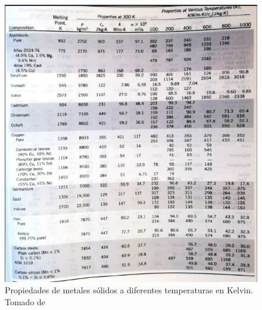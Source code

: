 \documentclass[12pt,letterpaper]{article}     %
\begin{document}
\begin{figure}[H]
\centering
\includegraphics[width=1.2\textwidth]{Imagines/propiedadesmet1.png}
\caption{Propiedades de metales sólidos a diferentes temperaturas en Kelvin. Tomado de \cite[p\ 1009]{yunus}}
\label{fig:propiedadesmetales1}
\end{figure}
\end{document}
